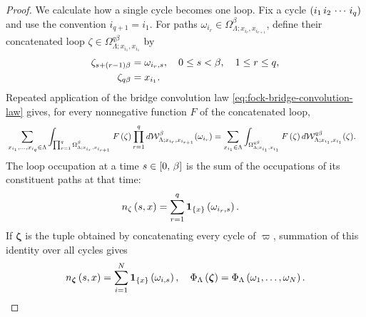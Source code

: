 \documentclass[11pt,a4paper]{article}
\theoremstyle{plain}
\theoremstyle{definition}
\theoremstyle{remark}
\begin{document}
\begin{proof}
We calculate how a single cycle becomes one loop.
Fix a cycle $\left( i_1\,i_2\,\cdots\,i_q \right)$ and use the convention $i_{q+1}=i_1$.
For paths $\omega_{i_r}\in\Omega_{\Lambda;x_{i_r},x_{i_{r+1}}}^{\beta}$, define their concatenated loop
$\zeta\in\Omega_{\Lambda;x_{i_1},x_{i_1}}^{q\beta}$ by
$$\begin{aligned}
\zeta_{s+\left( r-1 \right)\beta}
& =
\omega_{i_r,s},
\quad
0\leq s<\beta,
\quad
1\leq r\leq q,
\\
\zeta_{q\beta}
& =
x_{i_1}.
\end{aligned}$$
Repeated application of the bridge convolution law
\eqref{eq:fock-bridge-convolution-law} gives, for every nonnegative function $F$ of the
concatenated loop,
$$\begin{aligned}
&
\sum_{x_{i_1},\ldots,x_{i_q}\in\Lambda}
\int_{\prod_{r=1}^{q}
\Omega_{\Lambda;x_{i_r},x_{i_{r+1}}}^{\beta}}
F \left( \zeta \right)
\prod_{r=1}^{q}
\mathop{d \mathcal{W}_{\Lambda;x_{i_r},x_{i_{r+1}}}^{\beta}}(\omega_{i_r})
=
\sum_{x_{i_1}\in\Lambda}
\int_{\Omega_{\Lambda;x_{i_1},x_{i_1}}^{q\beta}}
F \left( \zeta \right)
\mathop{d \mathcal{W}_{\Lambda;x_{i_1},x_{i_1}}^{q\beta}}(\zeta).
\end{aligned}$$
The loop occupation at a time $s\in\left[ 0,\,\beta \right]$ is the sum of the occupations of its
constituent paths at that time:
$$\begin{aligned}
n_{\zeta} \left( s,x \right)
& =
\sum_{r=1}^{q}
\boldsymbol{1}_{\left\{ x \right\}} \left( \omega_{i_r,s} \right).
\end{aligned}$$
If $\boldsymbol{\zeta}$ is the tuple obtained by concatenating every cycle of $\varpi$, summation of this
identity over all cycles gives
$$\begin{aligned}
n_{\boldsymbol{\zeta}} \left( s,x \right)
=
\sum_{i=1}^{N}
\boldsymbol{1}_{\left\{ x \right\}} \left( \omega_{i,s} \right),
\quad
\Phi_{\Lambda} \left( \boldsymbol{\zeta} \right)
=
\Phi_{\Lambda} \left( \omega_1,\ldots,\omega_N \right).
\end{aligned}$$


\end{proof}
\end{document}
